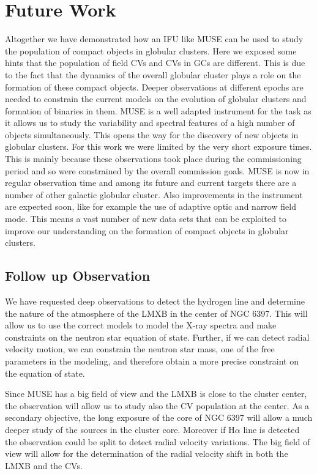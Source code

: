 \chapter{Future Work}\label{chap:future}
\thispagestyle{fancy}


Altogether we have demonstrated how an IFU like MUSE can be used to study the population of compact objects in globular clusters. Here we exposed some hints that the population of field CVs and CVs in  GCs are different. This is due to the fact that the dynamics of the overall globular cluster plays a role on the formation of these compact objects. Deeper observations at different epochs are needed to constrain the current models on the evolution of globular clusters and formation of binaries in them. MUSE is a well adapted instrument for the task as it allows us to study the variability and spectral features of a high number of objects simultaneously. This opens the way for the discovery of new objects in globular clusters. For this work we were limited by the very short exposure times. This is mainly because these observations took place during the commissioning period and so were constrained by the overall commission goals. MUSE is now in regular observation time and among its future and current targets there are a number of other galactic globular cluster. Also improvements in the instrument are expected soon, like for example the use of adaptive optic and narrow field mode. This means  a vast number of new data sets that can be exploited to improve our understanding on the formation of compact objects in globular clusters. 

\section{Follow up Observation}

We have requested deep observations to detect the hydrogen line and determine the nature of the atmosphere of the LMXB in the center of NGC 6397. This will allow us to use the correct models to model the X-ray spectra and make constraints on the neutron star equation of state. Further, if we can detect radial velocity motion, we can constrain the neutron star mass, one of the free parameters in the modeling, and therefore obtain a more precise constraint on the equation of state. 


 Since MUSE has a big field of view and the LMXB is close to the cluster center, the observation will allow us to study also the CV population at the center. As a secondary objective, the long exposure of the core of NGC 6397 will allow a much deeper study of the sources in the cluster core. Moreover if H$\alpha$ line is detected the observation could be split to detect radial velocity variations. The big field of view will allow for the determination of the radial velocity shift in both the LMXB and the CVs.  
    
